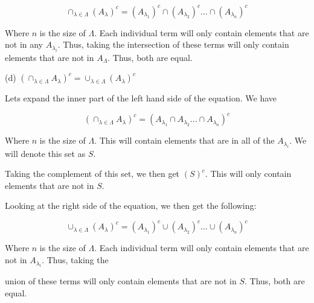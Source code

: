 \documentclass[addpoints]{exam}
\begin{document}
\begin{questions}
\[\cap_{\lambda \in \Lambda}(A_{\lambda})^c = (A_{\lambda_1})^c \cap (A_{\lambda_2})^c ... \cap (A_{\lambda_n})^c\]

Where $n$ is the size of $\Lambda$. Each individual term will only contain elements that are not in any $A_{\lambda_i}$. Thus, taking the
intersection of these terms will only contain elements that are not in $A_\Lambda$. Thus, both are equal.

(d) $(\cap_{\lambda \in \Lambda}A_{\lambda})^c = \cup_{\lambda \in \Lambda}(A_{\lambda})^c$

Lets expand the inner part of the left hand side of the equation. We have

\[(\cap_{\lambda \in \Lambda}A_{\lambda})^c = (A_{\lambda_1} \cap A_{\lambda_2} ... \cap A_{\lambda_n})^c\]

Where $n$ is the size of $\Lambda$. This will contain elements that are in all of the $A_{\lambda_i}$. We will denote this set as $S$.

Taking the complement of this set, we then get $(S)^c$. This will only contain elements that are not in $S$.

Looking at the right side of the equation, we then get the following:

\[\cup_{\lambda \in \Lambda}(A_{\lambda})^c = (A_{\lambda_1})^c \cup (A_{\lambda_2})^c ... \cup (A_{\lambda_n})^c\]

Where $n$ is the size of $\Lambda$. Each individual term will only contain elements that are not in $A_{\lambda_i}$. Thus, taking the

union of these terms will only contain elements that are not in $S$. Thus, both are equal.



\end{questions}
\end{document}
